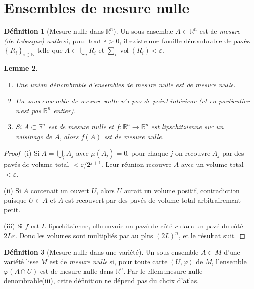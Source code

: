 \documentclass[12pt,a4paper,openany]{book}
\theoremstyle{definition}
\newtheorem{definition}{Définition}[chapter]
\theoremstyle{plain}
\newtheorem{lemme}[definition]{Lemme}
\theoremstyle{remark}
\newcommand{\N}{\mathbb{N}}
\newcommand{\R}{\mathbb{R}}
\newcommand{\set}[1]{\left\{#1\right\}}
\begin{document}
\section{Ensembles de mesure nulle}\label{sec:mesure-nulle}

\begin{definition}[Mesure nulle dans $\R^n$]\label{def:mesure-nulle}
Un sous-ensemble $A \subset \R^n$ est de \emph{mesure (de Lebesgue) nulle} si,
pour tout $\varepsilon > 0$, il existe une famille dénombrable de pavés
$\set{R_i}_{i \in \N}$ telle que $A \subset \bigcup_{i} R_i$ et
$\sum_{i} \operatorname{vol}(R_i) < \varepsilon$.
\end{definition}

\begin{lemme}\label{lem:mesure-nulle-denombrable}
\begin{enumerate}[label=(\roman*)]
  \item Une union dénombrable d'ensembles de mesure nulle est de mesure nulle.
  \item Un sous-ensemble de mesure nulle n'a pas de point intérieur (et en
  particulier n'est pas $\R^n$ entier).
  \item Si $A \subset \R^n$ est de mesure nulle et $f \colon \R^n \to \R^n$ est
  lipschitzienne sur un voisinage de $A$, alors $f(A)$ est de mesure nulle.
\end{enumerate}
\end{lemme}

\begin{proof}
(i) Si $A = \bigcup_j A_j$ avec $\mu(A_j) = 0$, pour chaque $j$ on recouvre
$A_j$ par des pavés de volume total $< \varepsilon/2^{j+1}$. Leur réunion
recouvre $A$ avec un volume total $< \varepsilon$.

(ii) Si $A$ contenait un ouvert $U$, alors $U$ aurait un volume positif,
contradiction puisque $U \subset A$ et $A$ est recouvert par des pavés de
volume total arbitrairement petit.

(iii) Si $f$ est $L$-lipschitzienne, elle envoie un pavé de côté $r$ dans un
pavé de côté $2Lr$. Donc les volumes sont multipliés par au plus $(2L)^n$, et
le résultat suit.
\end{proof}

\begin{definition}[Mesure nulle dans une variété]\label{def:mesure-nulle-variete}
Un sous-ensemble $A \subset M$ d'une variété lisse $M$ est de \emph{mesure
nulle} si, pour toute carte $(U, \varphi)$ de $M$, l'ensemble $\varphi(A \cap U)$
est de mesure nulle dans $\R^n$. Par le 
ef{lem:mesure-nulle-denombrable}(iii),
cette définition ne dépend pas du choix d'atlas.
\end{definition}
\end{document}
